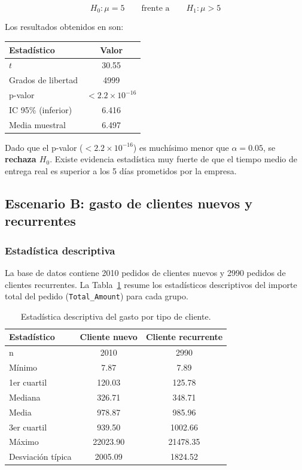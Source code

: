 \documentclass[11pt, a4paper]{article}
\begin{document}
\[
H_0: \mu = 5 \qquad \text{frente a} \qquad H_1: \mu > 5
\]

Los resultados obtenidos en son:

\begin{center}
\begin{tabular}{lc}
\toprule
Estadístico & Valor \\
\midrule
$t$ & 30.55 \\
Grados de libertad & 4999 \\
p-valor & $< 2.2 \times 10^{-16}$ \\
IC 95\% (inferior) & 6.416 \\
Media muestral & 6.497 \\
\bottomrule
\end{tabular}
\end{center}

Dado que el p-valor ($< 2.2 \times 10^{-16}$) es muchísimo menor que $\alpha = 0.05$, se 
\textbf{rechaza $H_0$}. Existe evidencia estadística muy fuerte de que el tiempo medio de 
entrega real es superior a los 5 días prometidos por la empresa.

\subsection{Escenario B: gasto de clientes nuevos y recurrentes}

\subsubsection{Estadística descriptiva}

La base de datos contiene 2010 pedidos de clientes nuevos y 2990 pedidos de clientes 
recurrentes. La Tabla~\ref{tab:desc_gasto} resume los estadísticos descriptivos del importe 
total del pedido (\texttt{Total\_Amount}) para cada grupo.

\begin{table}[H]
\centering
\begin{tabular}{lcc}
\toprule
Estadístico & Cliente nuevo & Cliente recurrente \\
\midrule
n & 2010 & 2990 \\
Mínimo & 7.87 & 7.89 \\
1er cuartil & 120.03 & 125.78 \\
Mediana & 326.71 & 348.71 \\
Media & 978.87 & 985.96 \\
3er cuartil & 939.50 & 1002.66 \\
Máximo & 22023.90 & 21478.35 \\
Desviación típica & 2005.09 & 1824.52 \\
\bottomrule
\end{tabular}
\caption{Estadística descriptiva del gasto por tipo de cliente.}
\label{tab:desc_gasto}
\end{table}
\end{document}
